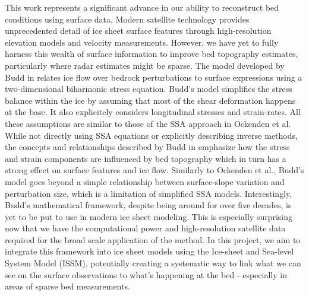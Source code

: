 This work represents a significant advance in our ability to reconstruct bed conditions using surface data. Modern satellite technology provides unprecedented detail of ice sheet surface features through high-resolution elevation models and velocity measurements. However, we have yet to fully harness this wealth of surface information to improve bed topography estimates, particularly where radar estimates might be sparse.
The model developed by Budd in \cite{Budd_1970} relates ice flow over bedrock perturbations to surface expressions using a two-dimensional biharmonic stress equation. Budd's model simplifies the stress balance within the ice by assuming that most of the shear deformation happens at the base. It also explicitely considers longitudinal stresses and strain-rates. All these assumptions are similar to those of the SSA approach in Ockenden et al. While not directly using SSA equations or explicitly describing inverse methods, the concepts and relationships described by Budd in\cite{Budd_1970} emphasize how the stress and strain components are influenced by bed topography which in turn has a strong effect on surface features and ice flow. Similarly to Ockenden et al., Budd's model goes beyond a simple relationship between surface-slope variation and perturbation size, which is a limitation of simplified SSA models.
Interestingly, Budd's mathematical framework, despite being around for over five decades, is yet to be put to use in modern ice sheet modeling. This is especially surprising now that we have the computational power and high-resolution satellite data required for the broad scale application of the method. In this project, we aim to integrate this framework into ice sheet models using the Ice-sheet and Sea-level System Model (ISSM), potentially creating a systematic way to link what we can see on the surface observations to what's happening at the bed - especially in areas of sparse bed measurements.
